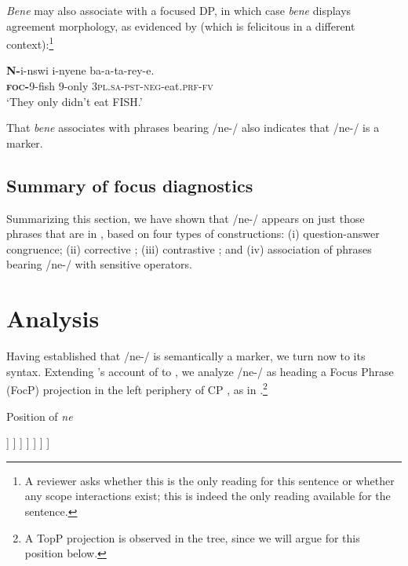 \documentclass[output=paper,modfonts]{langscibook}
\begin{document}
\textit{Bene} may also associate with a focused DP, in which case \textit{bene} displays  agreement morphology, as evidenced by  (which is felicitous in a different context):\footnote{%
  A reviewer asks whether this is the only reading for this sentence or whether any scope interactions exist; this is indeed the only reading available for the sentence.
}

\ea\label{ex:landmann:25}
  \gll \textbf{N-}i-nswi i-nyene ba-a-ta-rey-e.\\
     \textsc{\textbf{foc-}}9-fish 9-only \textsc{3pl}.\textsc{sa}-\textsc{pst}-\textsc{neg}-eat.\textsc{prf}-\textsc{fv}\\
\glt ‘They only didn’t eat FISH.’
\z

That  \textit{bene} associates with phrases bearing /ne-/ also indicates that /ne-/ is a  marker.


\subsection{Summary of focus diagnostics}



Summarizing this section, we have shown that /ne-/ appears on just those phrases that are in , based on four types of  constructions: (i) question-answer congruence; (ii) corrective ; (iii) contrastive ; and (iv) association of phrases bearing /ne-/ with  sensitive operators.

\section{Analysis}\label{sec:landman:4}


Having established that /ne-/ is semantically a  marker, we turn now to its syntax. Extending \citet{Schwarz2007}’s account of  to , we analyze /ne-/ as heading a Focus Phrase (FocP) projection in the left periphery of CP \citep{Rizzi1997}, as in .\footnote{A TopP projection is observed in the tree, since we will argue for this position below.}

\ea\label{ex:landmann:26}
\small
{Position of \textit{ne}}\nopagebreak
\\
\begin{forest}
[CP, for tree={nice empty nodes} [] [C'
	  [C] [TopP
	    [] [Top'
	     [Top] [FocP
	       [] [Foc'
	        [Foc\\\textit{ne}-,align=left,base=top] [TP [] [] ]
	       ]
	     ]	  
	  ]
        ]	  
    ]
] 
\end{forest}
\z 
\end{document}
